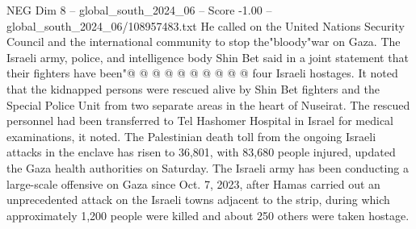 \begin{textsample}{NEG Dim 8 – global\_south\_2024\_06 – Score -1.00 – global\_south\_2024\_06/108957483.txt}
He called on the United Nations Security Council and the international community to stop the"bloody"war on Gaza.
The Israeli army, police, and intelligence body Shin Bet said in a joint statement that their fighters have been"@ @ @ @ @ @ @ @ @ @ four Israeli hostages.
It noted that the kidnapped persons were rescued alive by Shin Bet fighters and the Special Police Unit from two separate areas in the heart of Nuseirat.
The rescued personnel had been transferred to Tel Hashomer Hospital in Israel for medical examinations, it noted.
The Palestinian death toll from the ongoing Israeli attacks in the enclave has risen to 36,801, with 83,680 people injured, updated the Gaza health authorities on Saturday.
The Israeli army has been conducting a large-scale offensive on Gaza since Oct. 7, 2023, after Hamas carried out an unprecedented attack on the Israeli towns adjacent to the strip, during which approximately 1,200 people were killed and about 250 others were taken hostage.

\end{textsample}
